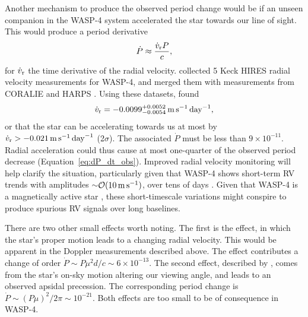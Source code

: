 \documentclass[12pt,twocolumn,tighten]{aastex62}
\begin{document}
Another mechanism to produce the observed period change would be if an
unseen companion in the WASP-4 system accelerated the star towards our
line of sight.
This would produce a period derivative
\begin{equation}
	\dot{P} \approx \frac{\dot{v}_{\rm r} P}{c},
\end{equation}
for $\dot{v}_{\rm r}$ the time derivative of the radial velocity.
\citet{knutson_friends_2014} collected 5 Keck HIRES radial
velocity measurements for WASP-4, and merged them with measurements
from CORALIE and HARPS \citep{wilson_wasp-4b_2008,pont_determining_2011,husnoo_observational_2012}.
Using these datasets, \citet{knutson_friends_2014} found 
\begin{equation}
\dot{v}_{\rm r} =
   -0.0099^{+0.0052}_{-0.0054}
   \,{\rm m}\,{\rm s}^{-1}\,{\rm day}^{-1},
\end{equation}
or that the
star can be accelerating towards us at most by $\dot{v}_{\rm r} > -
0.021 \,{\rm m}\,{\rm s}^{-1}\,{\rm day}^{-1}$ (2$\sigma$).
The associated $\dot{P}$ must be less than $9\times 10^{-11}$.  
Radial acceleration could thus cause at most one-quarter of the
observed period decrease (Equation~\ref{eq:dP_dt_obs}).
Improved radial velocity
monitoring will help clarify the situation,
particularly given that WASP-4 shows short-term RV trends with
amplitudes $\sim$$\mathcal{O}(10\,{\rm m\,s}^{-1})$, over tens of days
\citep{husnoo_observational_2012}.  Given that WASP-4 is a
magnetically active star \citep{sanchis-ojeda_starspots_2011}, these
short-timescale variations might conspire to produce spurious
RV signals over long baselines.

There are two other small effects worth noting.  The first is the
\citet{shklovskii_possible_1970} effect, in which the star's proper
motion leads to a changing radial velocity.  This would be apparent in
the Doppler measurements described above.  The effect contributes a
change of order $\dot{P} \sim P\mu^2 d/ c \sim 6\times10^{-13}$.  The
second effect, described by \citet{rafikov_stellar_2009}, comes from
the star's on-sky motion altering our viewing angle, and leads to an
observed apsidal precession.  The corresponding period change is
$\dot{P} \sim (P\mu)^2/2\pi \sim 10^{-21}$. Both effects are too small
to be of consequence in WASP-4.
\end{document}
